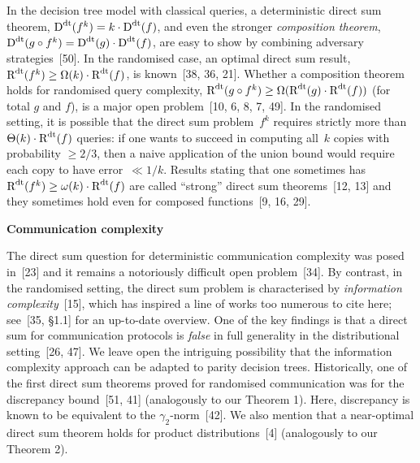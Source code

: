 In the decision tree model with classical queries, a deterministic direct sum theorem, ${\textup{D}}^{\textup{dt}}(f^{k})=k\cdot{\textup{D}}^{\textup{dt}}(f)$, and even the stronger \emph{composition theorem}, ${\textup{D}}^{\textup{dt}}(g\circ f^{k})={\textup{D}}^{\textup{dt}}(g)\cdot{\textup{D}}^{\textup{dt}}(f)$, are easy to show by combining adversary strategies [50]. In the randomised case, an optimal direct sum result, ${\textup{R}}^{\textup{dt}}(f^{k})\geq\Omega(k)\cdot{\textup{R}}^{\textup{dt}}(f)$, is known [38, 36, 21]. Whether a composition theorem holds for randomised query complexity, ${\textup{R}}^{\textup{dt}}(g\circ f^{k})\geq\Omega({\textup{R}}^{\textup{dt}}(g)\cdot{\textup{R}}^{\textup{dt}}(f))$ (for total $g$ and $f$), is a major open problem [10, 6, 8, 7, 49]. In the randomised setting, it is possible that the direct sum problem $f^{k}$ requires strictly more than $\Theta(k)\cdot{\textup{R}}^{\textup{dt}}(f)$ queries: if one wants to succeed in computing all $k$ copies with probability $\geq 2/3$, then a naive application of the union bound would require each copy to have error $\ll 1/k$. Results stating that one sometimes has ${\textup{R}}^{\textup{dt}}(f^{k})\geq\omega(k)\cdot{\textup{R}}^{\textup{dt}}(f)$ are called “strong” direct sum theorems [12, 13] and they sometimes hold even for composed functions [9, 16, 29].\par





\par\medskip\noindent\textbf{Communication complexity}\par




The direct sum question for deterministic communication complexity was posed in [23] and it remains a notoriously difficult open problem [34]. By contrast, in the randomised setting, the direct sum problem is characterised by \emph{information complexity} [15], which has inspired a line of works too numerous to cite here; see [35, §1.1] for an up-to-date overview. One of the key findings is that a direct sum for communication protocols is \emph{false} in full generality in the distributional setting [26, 47]. We leave open the intriguing possibility that the information complexity approach can be adapted to parity decision trees. Historically, one of the first direct sum theorems proved for randomised communication was for the discrepancy bound [51, 41] (analogously to our Theorem 1). Here, discrepancy is known to be equivalent to the $\gamma_{2}$-norm [42]. We also mention that a near-optimal direct sum theorem holds for product distributions [4] (analogously to our Theorem 2).\par






